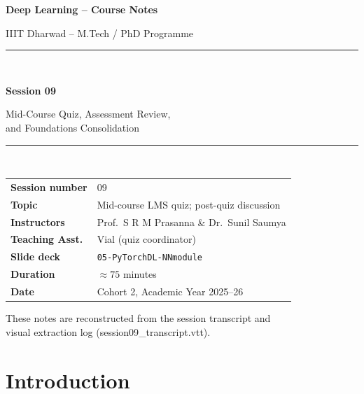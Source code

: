 \documentclass[12pt,a4paper]{article}
\begin{document}

\begin{titlepage}
  \centering
  \vspace*{2cm}
  {\LARGE\bfseries Deep Learning -- Course Notes\par}
  \vspace{0.5cm}
  {\large IIIT Dharwad -- M.Tech / PhD Programme\par}
  \vspace{1.5cm}
  \rule{\linewidth}{0.4pt}\\[0.4cm]
  {\Huge\bfseries Session 09\par}
  \vspace{0.3cm}
  {\Large Mid-Course Quiz, Assessment Review,\\[4pt]
          and Foundations Consolidation\par}
  \rule{\linewidth}{0.4pt}\\[1.5cm]
  \begin{tabular}{ll}
    \textbf{Session number} & 09 \\[4pt]
    \textbf{Topic}          & Mid-course LMS quiz; post-quiz discussion \\[4pt]
    \textbf{Instructors}    & Prof.\ S R M Prasanna \& Dr.\ Sunil Saumya \\[4pt]
    \textbf{Teaching Asst.} & Vial (quiz coordinator) \\[4pt]
    \textbf{Slide deck}     & \texttt{05-PyTorchDL-NNmodule} \\[4pt]
    \textbf{Duration}       & $\approx 75$ minutes \\[4pt]
    \textbf{Date}           & Cohort 2, Academic Year 2025--26 \\
  \end{tabular}
  \vfill
  {\small These notes are reconstructed from the session transcript and\\
  visual extraction log (session09\_transcript.vtt).}
\end{titlepage}

\tableofcontents
\newpage

\section{Introduction}
\label{sec:intro}
\end{document}
